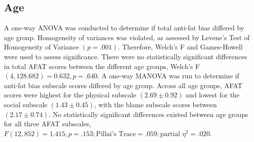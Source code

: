 \documentclass[
  jou,
  longtable,
  nolmodern,
  notxfonts,
  notimes,
  colorlinks=true,linkcolor=blue,citecolor=blue,urlcolor=blue]{apa7}
\begin{document}
\subsection{Age}\label{age}

A one-way ANOVA was conducted to determine if total anti-fat bias
differed by age group. Homogeneity of variances was violated, as
assessed by Levene's Test of Homogeneity of Variance \((p = .001)\).
Therefore, Welch's F and Games-Howell were used to assess significance.
There were no statistically significant differences in total AFAT scores
between the different age groups, Welch's F
\((4, 128.682) = 0.632, p = .640\). A one-way MANOVA was run to
determine if anti-fat bias subscale scores differed by age group. Across
all age groups, AFAT scores were highest for the physical subscale
\((2.69 \pm 0.92)\) and lowest for the social subscale
\((1.43 \pm 0.45)\), with the blame subscale scores between
\((2.17 \pm 0.74)\). No statistically significant differences existed
between age groups for all three AFAT subscales,
\(F(12,852) = 1.415, p =.153; \text{Pillai’s Trace} = .059; \text{partial } \eta^2 = .020\).
\end{document}

